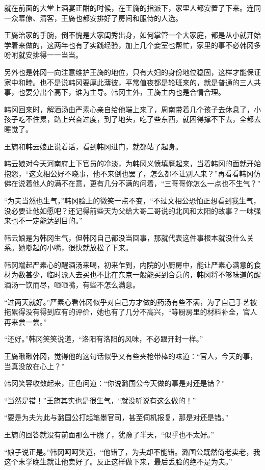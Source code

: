 就在前面的大堂上酒宴正酣的时候，在王旖的指派下，家里人都安置了下来。连同一众幕僚、清客，王旖也都安排好了房间和服侍的人选。

王旖治家的手腕，倒不愧是大家闺秀出身，如何掌管一个大家庭，都是从小就开始学着来做的，这两年也有了实践经验，加上几个妾室也帮忙，家里的事不必韩冈多吩咐就安排得一一当当。

另外也是韩冈一向注意维护王旖的地位，只有大妇的身份地位稳固，这样才能保证家中和睦。也不是说韩冈要厚此薄彼，平常值夜都是轮班来的，就是普通的三人共事，也要分出个高下，谁为主导。韩冈主外，王旖主内也是合情合理。

韩冈回来时，解酒汤由严素心亲自给他端上来了，周南带着几个孩子去休息了，小孩子吃不住累，路上兴奋过度，到了地头，吃了些东西，就困得撑不下去，全都去睡觉了。

王旖和韩云娘正说着话，看到韩冈进门，就都站了起身。

韩云娘对今天河南府上下官员的冷淡，为韩冈义愤填膺起来，当着韩冈的面就开始抱怨，“这文相公好不晓事，他不来倒也罢了，怎么都不让别人来？”再看看韩冈仿佛在说着他人的满不在意，更有几分不满的问着，“三哥哥你怎么一点也不生气？”

“为夫当然也生气，”韩冈脸上的微笑一点不变，“不过文相公恐怕正想看到我生气，没必要让他如愿吧？还记得前些天为父给大哥二哥说的北风和太阳的故事？一味强来也不一定能达到目的。”

韩云娘是为韩冈生气，但韩冈自己都没当回事，那就代表这件事根本就没什么关系。她嘟起的小嘴，很快就放松了下来。

韩冈端起严素心的醒酒汤来喝，初来乍到，内院的小厨房中，能让严素心满意的食材为数甚少，临时派人去买也不比在东京一般能买到合意的，韩冈将不够味道的醒酒汤一饮而尽，咂咂嘴，有些不怎么满意。

“过两天就好。”严素心看韩冈似乎对自己方才做的药汤有些不满，为了自己手艺被拖累得没有得到应有的评价，她也有了几分不高兴，“等厨房里的材料补全，官人再来尝一尝。”

“还好。”韩冈笑笑说道，“洛阳有洛阳的风味，不必跟开封一样。”

王旖瞅瞅韩冈，觉得他的这句话似乎又有些夹枪带棒的味道：“官人，今天的事，当真没放在心上？”

韩冈笑容收敛起来，正色问道：“你说潞国公今天做的事是对还是错？”

“当然是错！”王旖其实也是很生气，“就没听说有这么做的！”

“要是为夫为此与潞国公打起笔墨官司，甚至伺机报复，那是对还是错。”

王旖的回答就没有前面那么干脆了，犹豫了半天，“似乎也不太好。”

“娘子说正是。”韩冈呵呵笑道，“他错了，为夫却不能错。潞国公既然倚老卖老，我这个末学晚生就让他卖好了。反正这样做下来，最后丢脸的绝不是为夫。”

